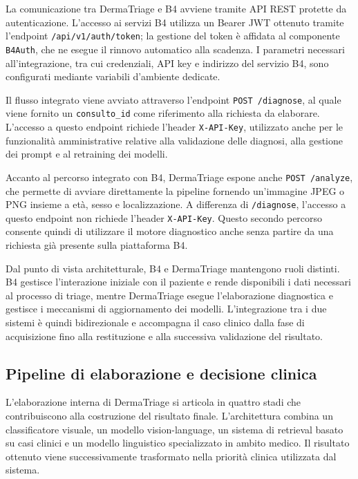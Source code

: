 La comunicazione tra DermaTriage e B4 avviene tramite API REST protette da autenticazione. L'accesso ai servizi B4 utilizza un Bearer JWT ottenuto tramite l'endpoint \texttt{/api/v1/auth/token}; la gestione del token è affidata al componente \texttt{B4Auth}, che ne esegue il rinnovo automatico alla scadenza. I parametri necessari all'integrazione, tra cui credenziali, API key e indirizzo del servizio B4, sono configurati mediante variabili d'ambiente dedicate.

Il flusso integrato viene avviato attraverso l'endpoint \texttt{POST /diagnose}, al quale viene fornito un \texttt{consulto\_id} come riferimento alla richiesta da elaborare. L'accesso a questo endpoint richiede l'header \texttt{X-API-Key}, utilizzato anche per le funzionalità amministrative relative alla validazione delle diagnosi, alla gestione dei prompt e al retraining dei modelli.

Accanto al percorso integrato con B4, DermaTriage espone anche \texttt{POST /analyze}, che permette di avviare direttamente la pipeline fornendo un'immagine JPEG o PNG insieme a età, sesso e localizzazione. A differenza di \texttt{/diagnose}, l'accesso a questo endpoint non richiede l'header \texttt{X-API-Key}. Questo secondo percorso consente quindi di utilizzare il motore diagnostico anche senza partire da una richiesta già presente sulla piattaforma B4.

Dal punto di vista architetturale, B4 e DermaTriage mantengono ruoli distinti. B4 gestisce l'interazione iniziale con il paziente e rende disponibili i dati necessari al processo di triage, mentre DermaTriage esegue l'elaborazione diagnostica e gestisce i meccanismi di aggiornamento dei modelli. L'integrazione tra i due sistemi è quindi bidirezionale e accompagna il caso clinico dalla fase di acquisizione fino alla restituzione e alla successiva validazione del risultato.

\subsection{Pipeline di elaborazione e decisione clinica}
L'elaborazione interna di DermaTriage si articola in quattro stadi che contribuiscono alla costruzione del risultato finale. L'architettura combina un classificatore visuale, un modello vision-language, un sistema di retrieval basato su casi clinici e un modello linguistico specializzato in ambito medico. Il risultato ottenuto viene successivamente trasformato nella priorità clinica utilizzata dal sistema.

